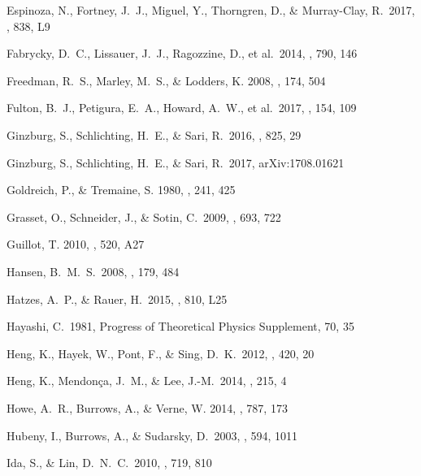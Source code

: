 \documentclass[]{emulateapj}
\begin{document}
\begin{thebibliography}{}
 Espinoza, N., Fortney, J.~J., Miguel, Y., Thorngren, D., \& Murray-Clay, R.\ 2017, \apjl, 838, L9 

 Fabrycky, D.~C., Lissauer, J.~J., Ragozzine, D., et al.\ 2014, \apj, 790, 146 

{Freedman}, R.~S., {Marley}, M.~S., \& {Lodders}, K. 2008, \apjs, 174, 504

 Fulton, B.~J., Petigura, E.~A., Howard, A.~W., et al.\ 2017, \aj, 154, 109 

 Ginzburg, S., Schlichting, H.~E., \& Sari, R.\ 2016, \apj, 825, 29 

 Ginzburg, S., Schlichting, H.~E., \& Sari, R.\ 2017, arXiv:1708.01621 


{Goldreich}, P., \& {Tremaine}, S. 1980, \apj, 241, 425

 Grasset, O., Schneider, J., \& Sotin, C.\ 2009, \apj, 693, 722 


{Guillot}, T. 2010, \aap, 520, A27

 Hansen, B.~M.~S.\ 2008, \apjs, 179, 484 

 Hatzes, A.~P., \& Rauer, H.\ 2015, \apjl, 810, L25 

 Hayashi, C.\ 1981, Progress of 
Theoretical Physics Supplement, 70, 35 

 Heng, K., Hayek, W., Pont, F., \& Sing, D.~K.\ 2012, \mnras, 420, 20 

 Heng, K., Mendon{\c c}a, J.~M., \& Lee, J.-M.\ 2014, \apjs, 215, 4 

{Howe}, A.~R., {Burrows}, A., \& {Verne}, W. 2014, \apj, 787, 173

 Hubeny, I., Burrows, A., \& Sudarsky, D.\ 2003, \apj, 594, 1011 

 Ida, S., \& Lin, D.~N.~C.\ 2010, \apj, 719, 810 


\end{thebibliography}
\end{document}
